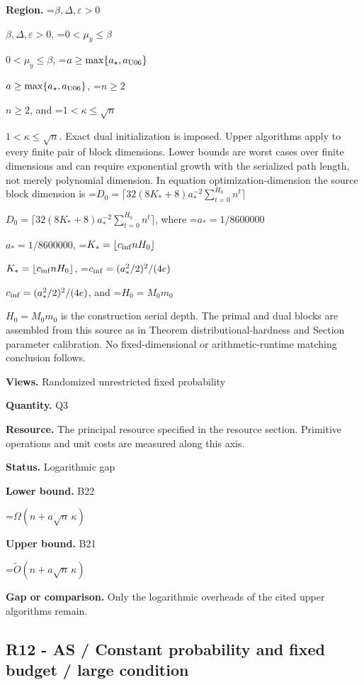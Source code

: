 \documentclass[10pt,a4paper]{article}
\newcommand{\AtlasMath}[1]{\par\begingroup\centering\setbox0=\hbox{$\displaystyle #1$}\ifdim\wd0>1.4\linewidth\typeout{ATLAS WIDE FORMULA: \the\wd0}\fi\ifdim\wd0>\linewidth\resizebox{\linewidth}{!}{\box0}\else\box0\fi\par\endgroup}
\newcommand{\AtlasInlineMath}[1]{\begingroup\setbox0=\hbox{$#1$}\ifdim\wd0>.4\linewidth\endgroup\AtlasMath{#1}\else\endgroup$#1$\fi}
\begin{document}
\textbf{Region.} \AtlasInlineMath{\beta,\Delta,\varepsilon>0}, \AtlasInlineMath{0<\mu_y\le\beta}, \AtlasInlineMath{a\ge\max\{a_\star,a_{\rm U06}\}}, \AtlasInlineMath{n\ge2}, and \AtlasInlineMath{1<\kappa\le\sqrt n}. Exact dual initialization is imposed. Upper algorithms apply to every finite pair of block dimensions. Lower bounds are worst cases over finite dimensions and can require exponential growth with the serialized path length, not merely polynomial dimension. In equation optimization-dimension the source block dimension is \AtlasInlineMath{D_0=\lceil32(8K_*+8)a_*^{-2}\sum_{t=0}^{H_0}n^t\rceil}, where \AtlasInlineMath{a_*=1/8600000}, \AtlasInlineMath{K_*=\lfloor c_{\rm inf}nH_0\rfloor}, \AtlasInlineMath{c_{\rm inf}=(a_*^2/2)^2/(4e)}, and \AtlasInlineMath{H_0=M_0m_0} is the construction serial depth. The primal and dual blocks are assembled from this source as in Theorem distributional-hardness and Section parameter calibration. No fixed-dimensional or arithmetic-runtime matching conclusion follows.



\textbf{Views.} Randomized unrestricted fixed probability



\textbf{Quantity.} Q3



\textbf{Resource.} The principal resource specified in the resource section. Primitive operations and unit costs are measured along this axis.



\textbf{Status.} Logarithmic gap



\textbf{Lower bound.} B22



\AtlasMath{\Omega(n+a\sqrt n\,\kappa)}


\textbf{Upper bound.} B21



\AtlasMath{\widetilde O(n+a\sqrt n\,\kappa)}


\textbf{Gap or comparison.} Only the logarithmic overheads of the cited upper algorithms remain.



\subsection{R12 - AS / Constant probability and fixed budget / large condition}
\end{document}
